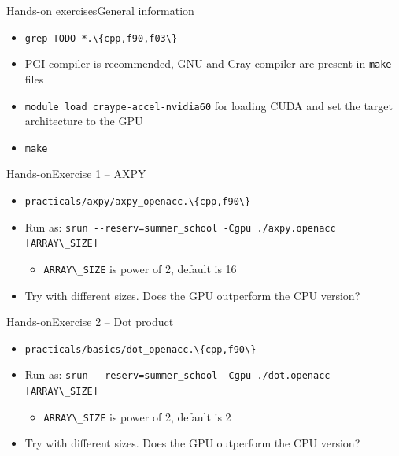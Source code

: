 \documentclass[12pt,aspectratio=169]{beamer}
\newcommand\shinline[2][]{\lstinline[style=shstyle,basicstyle=\ttfamily,#1]!#2!}
\begin{document}
\begin{frame}[fragile]{Hands-on exercises}{General information}
  \begin{itemize}
  \item \shinline{grep TODO *.\{cpp,f90,f03\}}
  \item PGI compiler is recommended, GNU and Cray compiler are present in \shinline{make} files
  \item \shinline{module load craype-accel-nvidia60} for loading CUDA and set the target architecture to the GPU
  \item \shinline{make}
  \end{itemize}
\end{frame}

\begin{frame}{Hands-on}{Exercise 1 -- AXPY}
  \begin{itemize}
  \item \shinline{practicals/axpy/axpy_openacc.\{cpp,f90\}}
  \item Run as: \shinline{srun --reserv=summer_school -Cgpu ./axpy.openacc [ARRAY\_SIZE]}
    \begin{itemize}
    \item \shinline{ARRAY\_SIZE} is power of 2, default is 16
    \end{itemize}
  \item Try with different sizes. Does the GPU outperform the CPU version?
  \end{itemize}
\end{frame}

\begin{frame}{Hands-on}{Exercise 2 -- Dot product}
  \begin{itemize}
  \item \shinline{practicals/basics/dot_openacc.\{cpp,f90\}}
  \item Run as: \shinline{srun --reserv=summer_school -Cgpu ./dot.openacc [ARRAY\_SIZE]}
    \begin{itemize}
    \item \shinline{ARRAY\_SIZE} is power of 2, default is 2
    \end{itemize}
  \item Try with different sizes. Does the GPU outperform the CPU version?
  \end{itemize}
\end{frame}
\end{document}
